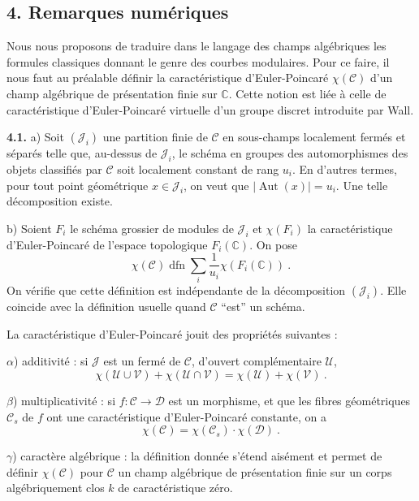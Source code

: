 \documentclass[10pt,a4paper]{amsart}
\theoremstyle{plain}
\theoremstyle{definition}
\DeclareMathOperator{\Aut}{Aut}
\newcommand{\cC}{\mathcal{C}}
\newcommand{\CC}{\mathbb{C}}
\newcommand{\cU}{\mathcal{U}}
\newcommand{\cD}{\mathcal{D}}
\newcommand{\cJ}{\mathcal{J}}
\newcommand{\cV}{\mathcal{V}}
\begin{document}
\subsection*{4. Remarques num\'eriques}

\setcounter{theorem}{0}
\setcounter{subsection}{3}
\setcounter{theorem}{0}

Nous nous proposons de traduire dans le langage des champs alg\'ebriques les formules classiques donnant le genre des courbes modulaires. Pour ce faire, il nous faut au pr\'ealable d\'efinir la caract\'eristique d'Euler-Poincar\'e $\chi(\cC)$ d'un champ alg\'ebrique de pr\'esentation finie sur $\CC$. Cette notion est li\'ee \`a celle de caract\'eristique d'Euler-Poincar\'e virtuelle d'un groupe discret introduite par Wall.

\medskip\noindent\textbf{4.1.} a) Soit $(\cJ_i)$ une partition finie de $\cC$ en sous-champs localement ferm\'es et s\'epar\'es telle que, au-dessus de $\cJ_i$, le sch\'ema en groupes des automorphismes des objets classifi\'es par $\cC$ soit localement constant de rang $u_i$. En d'autres termes, pour tout point g\'eom\'etrique $x \in \cJ_i$, on veut que $|\Aut(x)| = u_i$. Une telle d\'ecomposition existe.

b) Soient $F_i$ le sch\'ema grossier de modules de $\cJ_i$ et $\chi(F_i)$ la caract\'eristique d'Euler-Poincar\'e de l'espace topologique $F_i(\CC)$. On pose
\[
\chi(\cC) \;\text{dfn}\; \sum_i \frac{1}{u_i} \chi(F_i(\CC))\ .
\]
On v\'erifie que cette d\'efinition est ind\'ependante de la d\'ecomposition $(\cJ_i)$. Elle co\:incide avec la d\'efinition usuelle quand $\cC$ ``est'' un sch\'ema.

La caract\'eristique d'Euler-Poincar\'e jouit des propri\'et\'es suivantes :

$\alpha$) additivit\'e : si $\cJ$ est un ferm\'e de $\cC$, d'ouvert compl\'ementaire $\cU$,
\[
\chi(\cU \cup \cV) + \chi(\cU \cap \cV) = \chi(\cU) + \chi(\cV)\ .
\]

$\beta$) multiplicativit\'e : si $f : \cC \to \cD$ est un morphisme, et que les fibres g\'eom\'etriques $\cC_s$ de $f$ ont une caract\'eristique d'Euler-Poincar\'e constante, on a
\[
\chi(\cC) = \chi(\cC_s) \cdot \chi(\cD)\ .
\]

$\gamma$) caract\`ere alg\'ebrique : la d\'efinition donn\'ee s'\'etend ais\'ement et permet de d\'efinir $\chi(\cC)$ pour $\cC$ un champ alg\'ebrique de pr\'esentation finie sur un corps alg\'ebriquement clos $k$ de caract\'eristique z\'ero.
\end{document}
